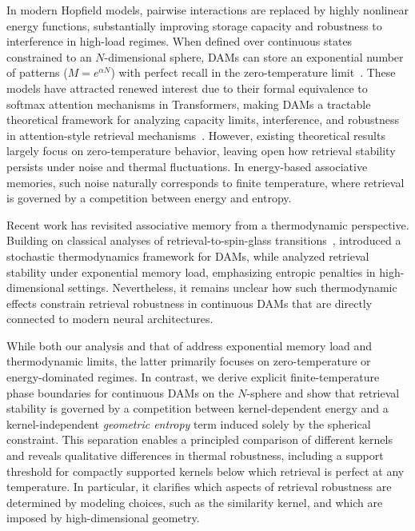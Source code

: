 \documentclass{article}
\theoremstyle{plain}
\theoremstyle{definition}
\theoremstyle{remark}
\begin{document}
In modern Hopfield models, pairwise interactions are replaced by highly nonlinear energy functions, substantially improving storage capacity and robustness to interference in high-load regimes. When defined over continuous states constrained to an $N$-dimensional sphere, DAMs can store an exponential number of patterns ($M = e^{\alpha N}$) with perfect recall in the zero-temperature limit~\citep{demircigil2017model,ramsauer2021hopfield,lucibello2024exponential}. These models have attracted renewed interest due to their formal equivalence to softmax attention mechanisms in Transformers, making DAMs a tractable theoretical framework for analyzing capacity limits, interference, and robustness in attention-style retrieval mechanisms~\citep{ramsauer2021hopfield}. However, existing theoretical results largely focus on zero-temperature behavior, leaving open how retrieval stability persists under noise and thermal fluctuations. In energy-based associative memories, such noise naturally corresponds to finite temperature, where retrieval is governed by a competition between energy and entropy.

Recent work has revisited associative memory from a thermodynamic perspective. Building on classical analyses of retrieval-to-spin-glass transitions~\citep{amit1987statistical}, \citet{rooke2026stochastic} introduced a stochastic thermodynamics framework for DAMs, while \citet{lucibello2024exponential} analyzed retrieval stability under exponential memory load, emphasizing entropic penalties in high-dimensional settings. Nevertheless, it remains unclear how such thermodynamic effects constrain retrieval robustness in continuous DAMs that are directly connected to modern neural architectures.

While both our analysis and that of \citet{lucibello2024exponential} address exponential memory load and thermodynamic limits, the latter primarily focuses on zero-temperature or energy-dominated regimes. In contrast, we derive explicit finite-temperature phase boundaries for continuous DAMs on the $N$-sphere and show that retrieval stability is governed by a competition between kernel-dependent energy and a kernel-independent \emph{geometric entropy} term induced solely by the spherical constraint. This separation enables a principled comparison of different kernels and reveals qualitative differences in thermal robustness, including a support threshold for compactly supported kernels below which retrieval is perfect at any temperature. In particular, it clarifies which aspects of retrieval robustness are determined by modeling choices, such as the similarity kernel, and which are imposed by high-dimensional geometry.
\end{document}
